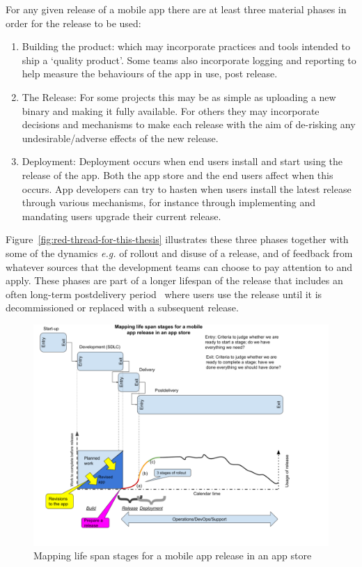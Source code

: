 For any given release of a mobile app there are at least three material phases in order for the release to be used:
\begin{enumerate}
    \item Building the product: which may incorporate practices and tools intended to ship a `quality product'. Some teams also incorporate logging and reporting to help measure the behaviours of the app in use, post release.
    \item The Release: For some projects this may be as simple as uploading a new binary and making it fully available. For others they may incorporate decisions and mechanisms to make each release with the aim of de-risking any undesirable/adverse effects of the new release.
    \item Deployment: Deployment occurs when end users install and start using the release of the app. Both the app store and the end users affect when this occurs. App developers can try to hasten when users install the latest release through various mechanisms, for instance through implementing and mandating users upgrade their current release.
\end{enumerate}

Figure~\ref{fig:red-thread-for-this-thesis} illustrates these three phases together with some of the dynamics \emph{e.g.} of rollout and disuse of a release, and of feedback from whatever sources that the development teams can choose to pay attention to and apply. These phases are part of a longer lifespan of the release that includes an often long-term postdelivery period~ where users use the release until it is decommissioned or replaced with a subsequent release.

\begin{figure}
    \includegraphics[width=\linewidth]{images/my/mobile-app-life-span-stages-21-sep-2021.pdf}
    \caption{Mapping life span stages for a mobile app release in an app store}
    \label{fig:mobile-app-life-span-stages}
\end{figure}

